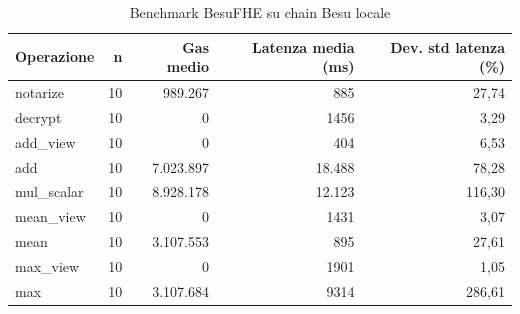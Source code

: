 \begin{table}[H]
\centering
\caption{Benchmark BesuFHE su chain Besu locale}
\label{tab:besufhe-local-benchmark}
\begin{tabular}{lrrrr}
\hline
\textbf{Operazione} & \textbf{n} & \textbf{Gas medio} & \textbf{Latenza media (ms)} & \textbf{Dev. std latenza (\%)} \\
\hline
notarize & 10 & 989.267 & 885 & 27,74 \\
decrypt & 10 & 0 & 1456 & 3,29 \\
add\_view & 10 & 0 & 404 & 6,53 \\
add & 10 & 7.023.897 & 18.488 & 78,28 \\
mul\_scalar & 10 & 8.928.178 & 12.123 & 116,30 \\
mean\_view & 10 & 0 & 1431 & 3,07 \\
mean & 10 & 3.107.553 & 895 & 27,61 \\
max\_view & 10 & 0 & 1901 & 1,05 \\
max & 10 & 3.107.684 & 9314 & 286,61 \\
\hline
\end{tabular}
\end{table}
\vspace{4pt}


